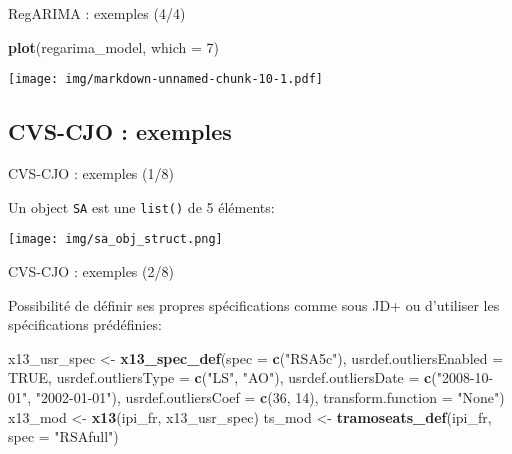 \documentclass[10pt,xcolor=table,color={dvipsnames,usenames},ignorenonframetext,usepdftitle=false,french]{beamer}
\newenvironment{Shaded}{\begin{snugshade}}{\end{snugshade}}
\newcommand{\DataTypeTok}[1]{\textcolor[rgb]{0.13,0.29,0.53}{#1}}
\newcommand{\DecValTok}[1]{\textcolor[rgb]{0.00,0.00,0.81}{#1}}
\newcommand{\KeywordTok}[1]{\textcolor[rgb]{0.13,0.29,0.53}{\textbf{#1}}}
\newcommand{\NormalTok}[1]{#1}
\newcommand{\OtherTok}[1]{\textcolor[rgb]{0.56,0.35,0.01}{#1}}
\newcommand{\StringTok}[1]{\textcolor[rgb]{0.31,0.60,0.02}{#1}}
\begin{document}
\begin{frame}[fragile]{RegARIMA : exemples (4/4)}
\protect\hypertarget{regarima-exemples-44}{}

\begin{Shaded}
\begin{Highlighting}[]
\KeywordTok{plot}\NormalTok{(regarima_model, }\DataTypeTok{which =} \DecValTok{7}\NormalTok{)}
\end{Highlighting}
\end{Shaded}

\texttt{[image: img/markdown-unnamed-chunk-10-1.pdf]}

\end{frame}

\hypertarget{cvs-cjo-exemples}{%
\subsection{CVS-CJO : exemples}\label{cvs-cjo-exemples}}

\begin{frame}[fragile]{CVS-CJO : exemples (1/8)}
\protect\hypertarget{cvs-cjo-exemples-18}{}

Un object \texttt{SA} est une \texttt{list()} de 5 éléments:

\texttt{[image: img/sa\_obj\_struct.png]}

\end{frame}

\begin{frame}[fragile]{CVS-CJO : exemples (2/8)}
\protect\hypertarget{cvs-cjo-exemples-28}{}

Possibilité de définir ses propres spécifications comme sous JD+ ou
d'utiliser les spécifications prédéfinies:

\footnotesize

\begin{Shaded}
\begin{Highlighting}[]
\NormalTok{x13_usr_spec <-}\StringTok{ }\KeywordTok{x13_spec_def}\NormalTok{(}\DataTypeTok{spec =} \KeywordTok{c}\NormalTok{(}\StringTok{"RSA5c"}\NormalTok{),}
                             \DataTypeTok{usrdef.outliersEnabled =} \OtherTok{TRUE}\NormalTok{,}
                             \DataTypeTok{usrdef.outliersType =} \KeywordTok{c}\NormalTok{(}\StringTok{"LS"}\NormalTok{, }\StringTok{"AO"}\NormalTok{),}
                             \DataTypeTok{usrdef.outliersDate =} \KeywordTok{c}\NormalTok{(}\StringTok{"2008-10-01"}\NormalTok{,}
                                                     \StringTok{"2002-01-01"}\NormalTok{),}
                             \DataTypeTok{usrdef.outliersCoef =} \KeywordTok{c}\NormalTok{(}\DecValTok{36}\NormalTok{, }\DecValTok{14}\NormalTok{),}
                             \DataTypeTok{transform.function =} \StringTok{"None"}\NormalTok{)}
\NormalTok{x13_mod <-}\StringTok{ }\KeywordTok{x13}\NormalTok{(ipi_fr, x13_usr_spec)}
\NormalTok{ts_mod <-}\StringTok{ }\KeywordTok{tramoseats_def}\NormalTok{(ipi_fr, }\DataTypeTok{spec =} \StringTok{"RSAfull"}\NormalTok{)}
\end{Highlighting}
\end{Shaded}

\end{frame}
\end{document}
